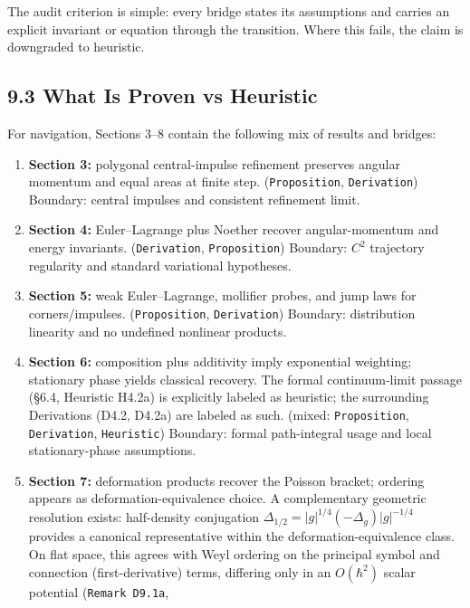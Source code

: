 \documentclass[
]{article}
\begin{document}
The audit criterion is simple: every bridge states its assumptions and
carries an explicit invariant or equation through the transition. Where
this fails, the claim is downgraded to heuristic.

\hypertarget{what-is-proven-vs-heuristic}{%
\subsection{9.3 What Is Proven vs
Heuristic}\label{what-is-proven-vs-heuristic}}

For navigation, Sections 3--8 contain the following mix of results and
bridges:

\begin{enumerate}
\def\labelenumi{\arabic{enumi}.}
\item
  \textbf{Section 3:} polygonal central-impulse refinement preserves
  angular momentum and equal areas at finite step.
  (\texttt{Proposition}, \texttt{Derivation}) Boundary: central impulses
  and consistent refinement limit.
\item
  \textbf{Section 4:} Euler--Lagrange plus Noether recover
  angular-momentum and energy invariants. (\texttt{Derivation},
  \texttt{Proposition}) Boundary: \(C^2\) trajectory regularity and
  standard variational hypotheses.
\item
  \textbf{Section 5:} weak Euler--Lagrange, mollifier probes, and jump
  laws for corners/impulses. (\texttt{Proposition}, \texttt{Derivation})
  Boundary: distribution linearity and no undefined nonlinear products.
\item
  \textbf{Section 6:} composition plus additivity imply exponential
  weighting; stationary phase yields classical recovery. The formal
  continuum-limit passage (§6.4, Heuristic H4.2a) is explicitly labeled
  as heuristic; the surrounding Derivations (D4.2, D4.2a) are labeled as
  such. (mixed: \texttt{Proposition}, \texttt{Derivation},
  \texttt{Heuristic}) Boundary: formal path-integral usage and local
  stationary-phase assumptions.
\item
  \textbf{Section 7:} deformation products recover the Poisson bracket;
  ordering appears as deformation-equivalence choice. A complementary
  geometric resolution exists: half-density conjugation
  \(\Delta_{1/2}=|g|^{1/4}(-\Delta_g)|g|^{-1/4}\) provides a canonical
  representative within the deformation-equivalence class. On flat
  space, this agrees with Weyl ordering on the principal symbol and
  connection (first-derivative) terms, differing only in an
  \(O(\hbar^2)\) scalar potential (\texttt{Remark\ D9.1a},

\end{enumerate}
\end{document}

